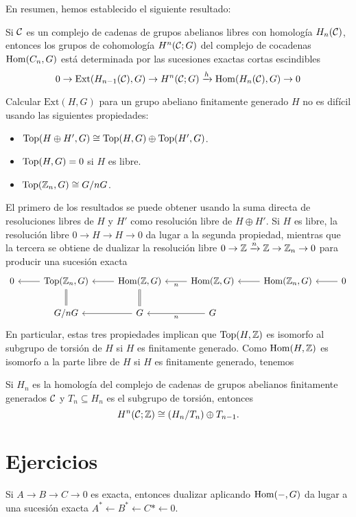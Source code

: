 \documentclass[TA.tex]{subfiles}
\begin{document}
En resumen, hemos establecido el siguiente resultado:
\begin{teorema}
Si $\mathcal{C}$ es un complejo de cadenas de grupos abelianos libres con homología $H_n(\mathcal{C})$, entonces los grupos de cohomología $H^n(\mathcal{C};G)$ del complejo de cocadenas $\operatorname{Hom}(C_n,G)$ está determinada por las sucesiones exactas cortas escindibles
\[
0\to \mathrm{Ext}(H_{n-1}(\mathcal{C}),G)\to H^n(\mathcal{C};G)\xrightarrow{h}\operatorname{Hom}(H_n(\mathcal{C}),G)\to 0
\]

Calcular $\mathrm{Ext}(H,G)$ para un grupo abeliano finitamente generado $H$ no es difícil usando las siguientes propiedades:
\begin{itemize}
\item $\operatorname{Top}(H\oplus H',G)\cong\operatorname{Top}(H,G)\oplus\operatorname{Top}(H',G)$.
\item $\operatorname{Top}(H,G)=0$ si $H$ es libre.
\item $\operatorname{Top}(\mathbb{Z}_n,G)\cong G/nG$.
\end{itemize}
\end{teorema}
El primero de los resultados se puede obtener usando la suma directa de resoluciones libres de $H$ y $H'$ como resolución libre de $H\oplus H'$. Si $H$ es libre, la resolución libre $0\to H\to H\to 0$ da lugar a la segunda propiedad, mientras que la tercera se obtiene de dualizar la resolución libre $0\to\mathbb{Z}\xrightarrow{n}\mathbb{Z}\to\mathbb{Z}_n\to 0$ para producir una sucesión exacta
\[
\begin{tikzcd}
0 & \Ext(\Z_n,G)\arrow[l]\arrow[d,equals] & \Hom(\Z,G)\arrow[l]\arrow[d, equals] &\Hom(\Z,G)\arrow[l, "n"] & \Hom(\Z_n,G)\arrow[l] & 0\arrow[l]\\
& G/nG &G\arrow[l] & G\arrow[l, "n"]
\end{tikzcd}
\]
En particular, estas tres propiedades implican que $\operatorname{Top}(H,\mathbb{Z})$ es isomorfo al subgrupo de torsión de $H$ si $H$ es finitamente generado. Como $\operatorname{Hom}(H,\mathbb{Z})$ es isomorfo a la parte libre de $H$ si $H$ es finitamente generado, tenemos
\begin{coro}
Si $H_n$ es la homología del complejo de cadenas de grupos abelianos finitamente generados $\mathcal{C}$ y $T_n\subseteq H_n$ es el subgrupo de torsión, entonces
\[
H^n(\mathcal{C};\mathbb{Z})\cong (H_n/T_n)\oplus T_{n-1}.
\]
\end{coro} 

\section{Ejercicios}
\begin{ejer}
Si $A\to B\to C\to 0$ es exacta, entonces dualizar aplicando $\operatorname{Hom}(-,G)$ da lugar a una sucesión exacta $A^*\leftarrow B^*\leftarrow C*\leftarrow 0$.
\end{ejer}
\end{document}
